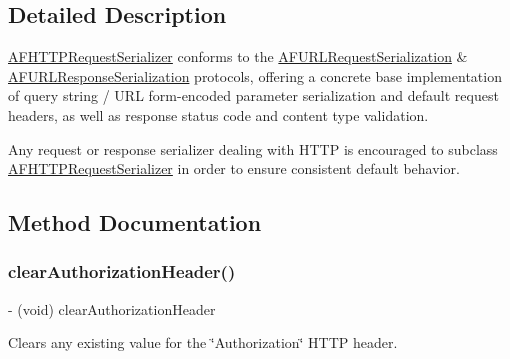 \subsection{Detailed Description}
{\ttfamily \mbox{\hyperlink{interface_a_f_h_t_t_p_request_serializer}{A\+F\+H\+T\+T\+P\+Request\+Serializer}}} conforms to the {\ttfamily \mbox{\hyperlink{class_a_f_u_r_l_request_serialization-p}{A\+F\+U\+R\+L\+Request\+Serialization}}} \& {\ttfamily \mbox{\hyperlink{class_a_f_u_r_l_response_serialization-p}{A\+F\+U\+R\+L\+Response\+Serialization}}} protocols, offering a concrete base implementation of query string / U\+RL form-\/encoded parameter serialization and default request headers, as well as response status code and content type validation.

Any request or response serializer dealing with H\+T\+TP is encouraged to subclass {\ttfamily \mbox{\hyperlink{interface_a_f_h_t_t_p_request_serializer}{A\+F\+H\+T\+T\+P\+Request\+Serializer}}} in order to ensure consistent default behavior. 

\subsection{Method Documentation}
\mbox{\label{interface_a_f_h_t_t_p_request_serializer_a211e5d5ca44cd3f2fe0e1f1deeb9ef17}} 
\subsubsection{\texorpdfstring{clear\+Authorization\+Header()}{clearAuthorizationHeader()}\hspace{0.1cm}{\footnotesize\ttfamily [1/3]}}
{\footnotesize\ttfamily -\/ (void) clear\+Authorization\+Header \begin{DoxyParamCaption}{ }\end{DoxyParamCaption}}

Clears any existing value for the \char`\"{}\+Authorization\char`\"{} H\+T\+TP header. \mbox{\label{interface_a_f_h_t_t_p_request_serializer_a211e5d5ca44cd3f2fe0e1f1deeb9ef17}} 
